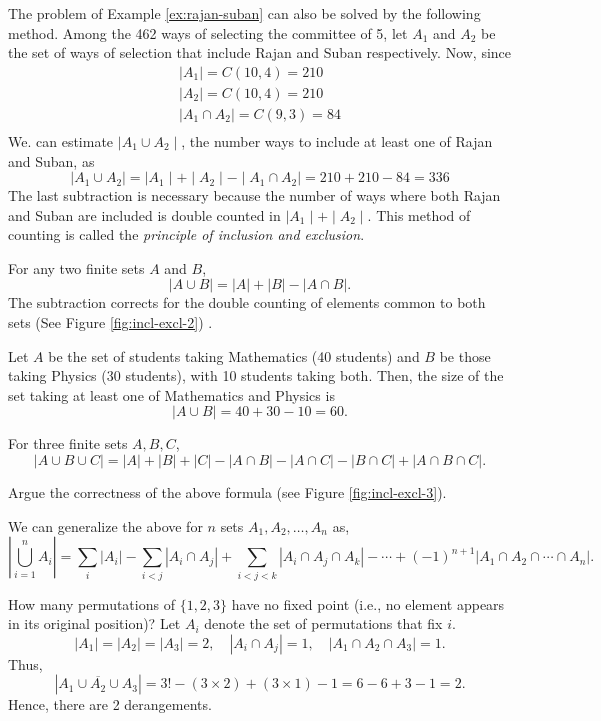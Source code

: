 The problem of Example \ref{ex:rajan-suban} can also be solved by the following method. Among the 462 ways of selecting the committee of 5, let $A_1$ and $A_2$ be the set of ways of selection that include Rajan and Suban respectively.  Now, since
\[
\begin{array}{l}
\mid A_1 \mid = C(10,4) = 210 \\
\mid A_2 \mid = C(10,4) = 210 \\
\mid A_1 \cap A_2 \mid = C(9,3) = 84 \\
\end{array}
\]
We. can estimate $\mid A_1 \cup A_2 \mid$, the number ways to include at least one of Rajan and Suban, as 
\[
\mid A_1 \cup A_2 \mid = \mid A_1 \mid + \mid A_2 \mid - \mid A_1 \cap A_2 \mid  = 210+210-84 = 336
\]
The last subtraction is necessary because the number of ways where both Rajan and Suban are included is double counted in $\mid A_1 \mid + \mid A_2 \mid$.  This method of counting is called the \emph{principle of inclusion and exclusion}.

For any two finite sets $A$ and $B$,
\[
|A \cup B| = |A| + |B| - |A \cap B|.
\]
The subtraction corrects for the double counting of elements common to both sets (See Figure \ref{fig:incl-excl-2}) .

\begin{example}
Let $A$ be the set of students taking Mathematics (40 students) and
$B$ be those taking Physics (30 students), with 10 students taking
both. Then, the size of the set taking at least one of Mathematics and Physics is
\[
|A \cup B| = 40 + 30 - 10 = 60.
\]
\end{example}


For three finite sets $A,B,C$,
\[
|A \cup B \cup C| =
|A| + |B| + |C|
- |A \cap B| - |A \cap C| - |B \cap C|
+ |A \cap B \cap C|.
\]

\begin{exercise}
Argue the correctness of the above formula (see Figure \ref{fig:incl-excl-3}).
\end{exercise}

We can generalize the above for $n$ sets $A_1, A_2, \ldots, A_n$ as,
\[
\left|\bigcup_{i=1}^{n} A_i\right|
= \sum_{i} |A_i|
- \sum_{i<j} |A_i \cap A_j|
+ \sum_{i<j<k} |A_i \cap A_j \cap A_k|
- \cdots + (-1)^{n+1} |A_1 \cap A_2 \cap \cdots \cap A_n|.
\]

\begin{example}[Derangements]
How many permutations of $\{1,2,3\}$ have no fixed point (i.e., no
element appears in its original position)?  
Let $A_i$ denote the set of permutations that fix $i$.  
\[
|A_1|=|A_2|=|A_3|=2,\quad
|A_i \cap A_j|=1,\quad
|A_1 \cap A_2 \cap A_3|=1.
\]
Thus,
\[
|\overline{A_1 \cup A_2 \cup A_3}| =
3! - (3\times2) + (3\times1) - 1 = 6 - 6 + 3 - 1 = 2.
\]
Hence, there are 2 derangements.
\end{example}

